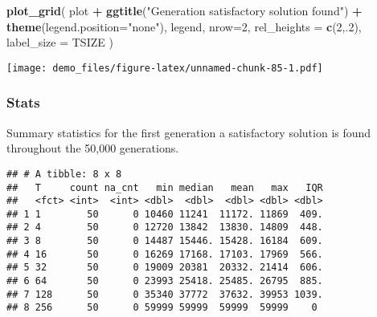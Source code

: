 \documentclass[]{book}
\newenvironment{Shaded}{\begin{snugshade}}{\end{snugshade}}
\newcommand{\DataTypeTok}[1]{\textcolor[rgb]{0.13,0.29,0.53}{#1}}
\newcommand{\DecValTok}[1]{\textcolor[rgb]{0.00,0.00,0.81}{#1}}
\newcommand{\KeywordTok}[1]{\textcolor[rgb]{0.13,0.29,0.53}{\textbf{#1}}}
\newcommand{\NormalTok}[1]{#1}
\newcommand{\OperatorTok}[1]{\textcolor[rgb]{0.81,0.36,0.00}{\textbf{#1}}}
\newcommand{\OtherTok}[1]{\textcolor[rgb]{0.56,0.35,0.01}{#1}}
\newcommand{\StringTok}[1]{\textcolor[rgb]{0.31,0.60,0.02}{#1}}
\begin{document}
\begin{Shaded}
\begin{Highlighting}[]
\KeywordTok{plot_grid}\NormalTok{(}
\NormalTok{  plot }\OperatorTok{+}
\StringTok{    }\KeywordTok{ggtitle}\NormalTok{(}\StringTok{"Generation satisfactory solution found"}\NormalTok{) }\OperatorTok{+}
\StringTok{    }\KeywordTok{theme}\NormalTok{(}\DataTypeTok{legend.position=}\StringTok{"none"}\NormalTok{),}
\NormalTok{  legend,}
  \DataTypeTok{nrow=}\DecValTok{2}\NormalTok{,}
  \DataTypeTok{rel_heights =} \KeywordTok{c}\NormalTok{(}\DecValTok{2}\NormalTok{,.}\DecValTok{2}\NormalTok{),}
  \DataTypeTok{label_size =}\NormalTok{ TSIZE}
\NormalTok{)}
\end{Highlighting}
\end{Shaded}

\texttt{[image: demo\_files/figure-latex/unnamed-chunk-85-1.pdf]}

\hypertarget{stats-14}{%
\subsubsection{Stats}\label{stats-14}}

Summary statistics for the first generation a satisfactory solution is found throughout the 50,000 generations.

\begin{Shaded}
\end{Shaded}

\begin{verbatim}
## # A tibble: 8 x 8
##   T     count na_cnt   min median   mean   max   IQR
##   <fct> <int>  <int> <dbl>  <dbl>  <dbl> <dbl> <dbl>
## 1 1        50      0 10460 11241  11172. 11869  409.
## 2 4        50      0 12720 13842  13830. 14809  448.
## 3 8        50      0 14487 15446. 15428. 16184  609.
## 4 16       50      0 16269 17168. 17103. 17969  566.
## 5 32       50      0 19009 20381  20332. 21414  606.
## 6 64       50      0 23993 25418. 25485. 26795  885.
## 7 128      50      0 35340 37772  37632. 39953 1039.
## 8 256      50      0 59999 59999  59999  59999    0
\end{verbatim}
\end{document}
